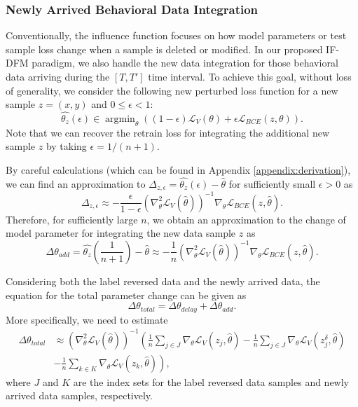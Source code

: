 \subsubsection{Newly Arrived Behavioral Data Integration}
Conventionally, the influence function focuses on how model parameters or test sample loss change when a sample is deleted or modified. In our proposed IF-DFM paradigm, we also handle the new data integration for those behavioral data arriving during the $[T, T']$ time interval. To achieve this goal, without loss of generality, we consider the following new perturbed loss function for a new sample $z = (x, y)$ and $0 \leq \epsilon < 1$:
\begin{equation}
\label{eq: perturbed-loss-add}
\widehat{\theta_z}(\epsilon) \in \mathop{\arg\min}_{\theta} \left((1 - \epsilon)\mathcal{L}_{{V}}(\theta)+\epsilon \mathcal{L}_{{BCE}}\left(z,\theta\right)\right).
\end{equation}
Note that we can recover the retrain loss for integrating the additional new sample $z$ by taking $\epsilon = 1/(n+1)$.

By careful calculations (which can be found in Appendix \ref{appendix:derivation}), we can find an approximation to $\Delta_{z, \epsilon} = \widehat{\theta_z}(\epsilon) - \hat{\theta}$ for sufficiently small $\epsilon > 0$ as
\begin{equation}
\label{eq: Delta_incremental}
    \Delta_{z, \epsilon} \approx -\frac{\epsilon}{1 - \epsilon}\left(\nabla^2_{\theta}\mathcal{L}_V(\hat{\theta})\right)^{-1}\nabla_{\theta}\mathcal{L}_{BCE}(z, \hat{\theta}).
\end{equation}
Therefore, for sufficiently large $n$, we obtain an approximation to the change of model parameter for integrating the new data sample $z$ as
\begin{equation}
\label{delta-add}
    \Delta\theta_{add} = \widehat{\theta_z}\left(\frac{1}{n+1}\right) - \hat{\theta} \approx -\frac{1}{n}\left(\nabla^2_{\theta}\mathcal{L}_V(\hat{\theta})\right)^{-1}\nabla_{\theta}\mathcal{L}_{BCE}(z, \hat{\theta}).
\end{equation}

Considering both the label reversed data and the newly arrived data, the equation for the total parameter change can be given as
\begin{equation}
\Delta \theta_{total} = \Delta \theta_{delay} + \Delta \theta_{add}.
\end{equation}
More specifically, we need to estimate 
\begin{equation}
\begin{aligned}
\Delta \theta_{total} & \approx \left(\nabla_\theta^2 \mathcal{L}_{{V}}(\hat{\theta})\right)^{-1}\left(\frac{1}{n}\sum_{j \in J} \nabla_\theta \mathcal{L}_{{V}}\left(z_j, \hat{\theta}\right) - \frac{1}{n}\sum_{j \in J} \nabla_\theta \mathcal{L}_{{V}}\left(z_j^\delta, \hat{\theta}\right) \right.\\
 & \left. - \frac{1}{n}\sum_{k \in K} \nabla_\theta \mathcal{L}_{{V}}\left(z_k, \hat{\theta}\right)\right),
\label{total}
\end{aligned}
\end{equation}
where $J$ and $K$ are the index sets for the label reversed data samples and newly arrived data samples, respectively.

